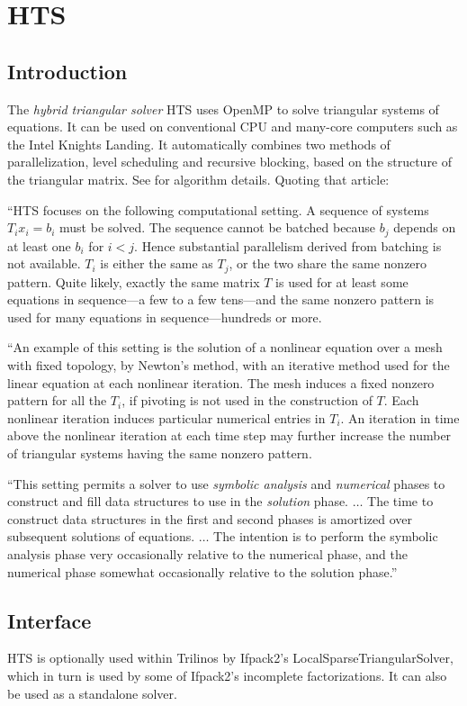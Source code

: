 \chapter{HTS}
\label{C:HTS}

\section{Introduction}\label{S:HTS:Introduction}
The \emph{hybrid triangular solver} HTS uses OpenMP to solve triangular systems of equations.
It can be used on conventional CPU and many-core computers such as the Intel Knights Landing.
It automatically combines two methods of parallelization, level scheduling and recursive blocking,
based on the structure of the triangular matrix.
See \cite{bradley2016hybrid} for algorithm details. Quoting that article:

``HTS focuses on the following computational setting. A sequence of systems $T_i
x_i = b_i$ must be solved. The sequence cannot be batched because $b_j$ depends
on at least one $b_i$ for $i < j$. Hence substantial parallelism derived from
batching is not available. $T_i$ is either the same as $T_j$, or the two share
the same nonzero pattern. Quite likely, exactly the same matrix $T$ is used for
at least some equations in sequence---a few to a few tens---and the same nonzero
pattern is used for many equations in sequence---hundreds or more.

``An example of this setting is the solution of a nonlinear equation over a mesh
with fixed topology, by Newton's method, with an iterative method used for the
linear equation at each nonlinear iteration. The mesh induces a fixed nonzero
pattern for all the $T_i$, if pivoting is not used in the construction of
$T$. Each nonlinear iteration induces particular numerical entries in $T_i$. An
iteration in time above the nonlinear iteration at each time step may further
increase the number of triangular systems having the same nonzero pattern.

``This setting permits a solver to use {\it symbolic analysis} and {\it numerical}
phases to construct and fill data structures to use in the {\it solution}
phase. $\ldots$ The time
to construct data structures in the first and second phases is amortized over
subsequent solutions of equations. $\ldots$ The intention is
to perform the symbolic analysis phase very occasionally relative to the
numerical phase, and the numerical phase somewhat occasionally relative to the
solution phase.''

\section{Interface}\label{S:HTS:Interface}
HTS is optionally used within Trilinos by Ifpack2's LocalSparseTriangularSolver,
which in turn is used by some of Ifpack2's incomplete factorizations.
It can also be used as a standalone solver.

